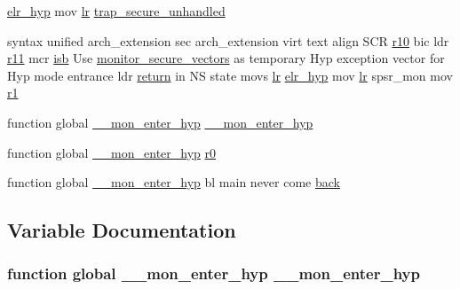 \begin{DoxyCompactItemize}
\hyperlink{monitor_8_s_ad6a37adf2074ccea5c6cd85fe6676b30}{elr\-\_\-hyp} mov \hyperlink{context_8h_a6ced3f4007bb60daf12191c058e55b8c}{lr} \hyperlink{monitor__secure_8_s_ac8b690ca33483cbcbeccd0541a1b8edd}{trap\-\_\-secure\-\_\-unhandled}
\item 
syntax unified arch\-\_\-extension \*
sec arch\-\_\-extension virt text \*
align \-S\-C\-R \hyperlink{monitor__secure_8_s_ac3bf51173e39a81ec089049af2b9b854}{r10} bic ldr \hyperlink{monitor__secure_8_s_a8788e5e3f963472b5ed8405a3340c314}{r11} mcr \*
\hyperlink{asm-arm__inline_8h_a14f7cb726dd83983648772947d1e60d8}{isb} \-Use \hyperlink{monitor__secure_8_s_a4d354f7295ddc2f288384d4e03458837}{monitor\-\_\-secure\-\_\-vectors} \*
as temporary \-Hyp exception \*
vector for \-Hyp mode entrance \*
ldr \hyperlink{monitor_8_s_afb820df2c9dbd34b23c1372ce18de4a8}{return} in \-N\-S state movs \hyperlink{context_8h_a6ced3f4007bb60daf12191c058e55b8c}{lr} \*
\hyperlink{monitor_8_s_ad6a37adf2074ccea5c6cd85fe6676b30}{elr\-\_\-hyp} mov \hyperlink{context_8h_a6ced3f4007bb60daf12191c058e55b8c}{lr} spsr\-\_\-mon mov \hyperlink{monitor__secure_8_s_a9936d57a6e416957ad6f37e2a80f3757}{r1}
\item 
function global \hyperlink{monitor__private_8h_a69164ae8f2dca08eb80cf308869f4945}{\-\_\-\-\_\-mon\-\_\-enter\-\_\-hyp} \hyperlink{monitor__secure_8_s_ac1d64f875232fc25f9d484f96ee38159}{\-\_\-\-\_\-mon\-\_\-enter\-\_\-hyp}
\item 
function global \hyperlink{monitor__private_8h_a69164ae8f2dca08eb80cf308869f4945}{\-\_\-\-\_\-mon\-\_\-enter\-\_\-hyp} \hyperlink{monitor__secure_8_s_a52d1ac37c436f49666d8e195af78d552}{r0}
\item 
function global \*
\hyperlink{monitor__private_8h_a69164ae8f2dca08eb80cf308869f4945}{\-\_\-\-\_\-mon\-\_\-enter\-\_\-hyp} bl main never \*
come \hyperlink{monitor__secure_8_s_a0352f684605c42dc5f2fff2984dd68d3}{back}
\end{DoxyCompactItemize}


\subsection{\-Variable \-Documentation}
\hypertarget{monitor__secure_8_s_ac1d64f875232fc25f9d484f96ee38159}{
\subsubsection[{\-\_\-\-\_\-mon\-\_\-enter\-\_\-hyp}]{\setlength{\rightskip}{0pt plus 5cm}function global {\bf \-\_\-\-\_\-mon\-\_\-enter\-\_\-hyp} {\bf \-\_\-\-\_\-mon\-\_\-enter\-\_\-hyp}}}\label{monitor__secure_8_s_ac1d64f875232fc25f9d484f96ee38159}



